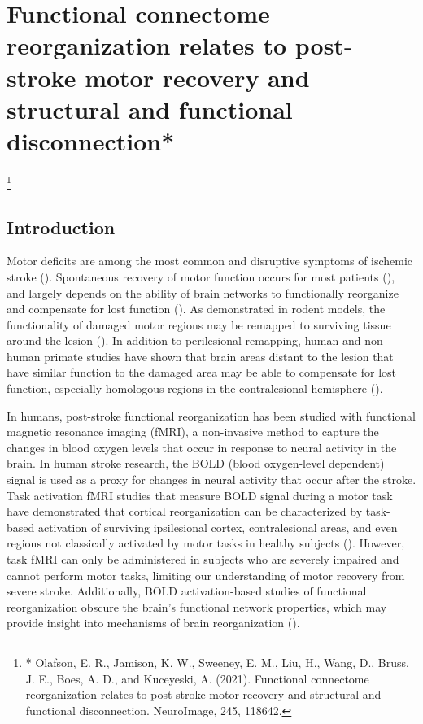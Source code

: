 \documentclass[phd,tocprelim]{cornell}
\newcommand\blfootnote[1]{%
  \begingroup
  \renewcommand\thefootnote{}\footnote{#1}%
  \addtocounter{footnote}{-1}%
  \endgroup
}
\begin{document}
\chapter{Functional connectome reorganization relates to post-stroke motor recovery and structural and functional disconnection*}
\blfootnote{* Olafson, E. R., Jamison, K. W., Sweeney, E. M., Liu, H., Wang, D., Bruss, J. E., Boes, A. D., and Kuceyeski, A. (2021). Functional connectome reorganization relates to post-stroke motor recovery and structural and functional disconnection. NeuroImage, 245, 118642.}

%
\section{Introduction}
Motor deficits are among the most common and disruptive symptoms of ischemic stroke (\cite{Kelly-Hayes2003-sp}). Spontaneous recovery of motor function occurs for most patients (\cite{Duncan2000-uj}), and largely depends on the ability of brain networks to functionally reorganize and compensate for lost function (\cite{Grefkes2008-bt, Rehme2013-ap}). As demonstrated in rodent models, the functionality of damaged motor regions may be remapped to surviving tissue around the lesion (\cite{Winship2009-af,Brown2009-jn}).  In addition to perilesional remapping, human and non-human primate studies have shown that brain areas distant to the lesion that have similar function to the damaged area may be able to compensate for lost function, especially homologous regions in the contralesional hemisphere (\cite{Murata2015-ss, Ward2003-zd, Cramer1997-ko,Cao1998-iq}).  

In humans, post-stroke functional reorganization has been studied with functional magnetic resonance imaging (fMRI), a non-invasive method to capture the changes in blood oxygen levels that occur in response to neural activity in the brain. In human stroke research, the BOLD (blood oxygen-level dependent) signal is used as a proxy for changes in neural activity that occur after the stroke. Task activation fMRI studies that measure BOLD signal during a motor task have demonstrated that cortical reorganization can be characterized by task-based activation of surviving ipsilesional cortex, contralesional areas, and even regions not classically activated by motor tasks in healthy subjects (\cite{Ward2003-zd,Park2011-kx}). However, task fMRI can only be administered in subjects who are severely impaired and cannot perform motor tasks, limiting our understanding of motor recovery from severe stroke. Additionally,  BOLD activation-based studies of functional reorganization obscure the brain's functional network properties, which may provide insight into mechanisms of brain reorganization (\cite{Griffis2019-cy}).
 
\end{document}
